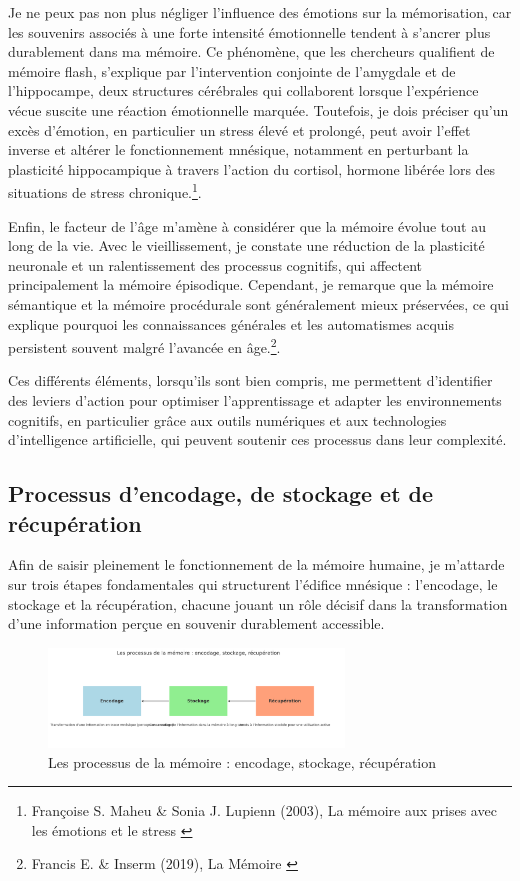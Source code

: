 \documentclass[11pt,a4paper]{report}
\begin{document}
Je ne peux pas non plus négliger l’influence des émotions sur la mémorisation, car les souvenirs associés à une forte intensité émotionnelle tendent à s’ancrer plus durablement dans ma mémoire. Ce phénomène, que les chercheurs qualifient de mémoire flash, s’explique par l’intervention conjointe de l’amygdale et de l’hippocampe, deux structures cérébrales qui collaborent lorsque l’expérience vécue suscite une réaction émotionnelle marquée. Toutefois, je dois préciser qu’un excès d’émotion, en particulier un stress élevé et prolongé, peut avoir l’effet inverse et altérer le fonctionnement mnésique, notamment en perturbant la plasticité hippocampique à travers l’action du cortisol, hormone libérée lors des situations de stress chronique.\footnote{Françoise S. Maheu \& Sonia J. Lupienn (2003), La mémoire aux prises avec les émotions et le stress \cite{maheulupienn}}.

Enfin, le facteur de l’âge m’amène à considérer que la mémoire évolue tout au long de la vie. Avec le vieillissement, je constate une réduction de la plasticité neuronale et un ralentissement des processus cognitifs, qui affectent principalement la mémoire épisodique. Cependant, je remarque que la mémoire sémantique et la mémoire procédurale sont généralement mieux préservées, ce qui explique pourquoi les connaissances générales et les automatismes acquis persistent souvent malgré l’avancée en âge.\footnote{Francis E. \& Inserm (2019), La Mémoire \cite{inserm}}.

Ces différents éléments, lorsqu’ils sont bien compris, me permettent d’identifier des leviers d’action pour optimiser l’apprentissage et adapter les environnements cognitifs, en particulier grâce aux outils numériques et aux technologies d’intelligence artificielle, qui peuvent soutenir ces processus dans leur complexité.

\subsection{Processus d’encodage, de stockage et de récupération}

Afin de saisir pleinement le fonctionnement de la mémoire humaine, je m’attarde sur trois étapes fondamentales qui structurent l’édifice mnésique : l’encodage, le stockage et la récupération, chacune jouant un rôle décisif dans la transformation d’une information perçue en souvenir durablement accessible.

\begin{figure}[h]
    \centering
    \includegraphics[width=0.7\textwidth]{images/1.1.3.png}
    \caption{Les processus de la mémoire : encodage, stockage, récupération}
    \label{fig:1.1.3}
\end{figure}
\end{document}
